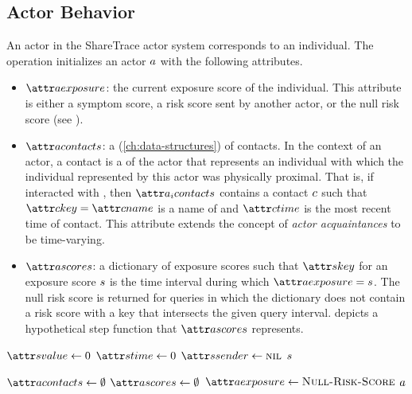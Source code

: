 \subsection{Actor Behavior}

An actor in the ShareTrace actor system corresponds to an individual. The \cCreateActor operation \citep{Agha1985} initializes an actor $a$ with the following attributes.
\begin{itemize}
  \item $\aActorExposure$: the current exposure score of the individual. This attribute is either a symptom score, a risk score sent by another actor, or the null risk score (see \cNullRiskScore).
  \item $\aActorContacts$: a  (\cref{ch:data-structures}) of contacts. In the context of an actor, a contact is a  \citep{Gamma1995} of the actor that represents an individual with which the individual represented by this actor was physically proximal. That is, if  interacted with , then $\aContacts{\vActor_i}$ contains a contact $c$ such that $\aContactKey = \aContactName$ is a name of  and $\aContactTime$ is the most recent time of contact. This attribute extends the concept of \emph{actor acquaintances} \citep{Hewitt1977a, Hewitt1977b, Agha1985} to be time-varying.
  \item $\aActorScores$: a dictionary of exposure scores such that $\aScoreKey$ for an exposure score $s$ is the time interval during which $\aActorExposure = \vScore$. The null risk score is returned for queries in which the dictionary does not contain a risk score with a key that intersects the given query interval.  depicts a hypothetical step function that $\aActorScores$ represents.
\end{itemize}

\begin{function}[H]{\nNullRiskScore}
  \State $\aScoreValue \assign 0$
  \State $\aScoreTime \assign 0$
  \State $\aScoreSender \assign \nil$
  \State \Return $s$
\end{function}

\begin{function}[H]{\nCreateActor}
  \State $\aActorContacts \assign \emptyset$
  \State $\aActorScores \assign \emptyset$
  \State $\aActorExposure \assign \cNullRiskScore$
  \State \Return $a$
\end{function}


